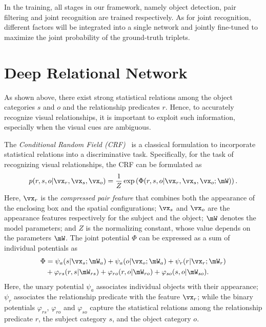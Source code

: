 \documentclass[10pt,twocolumn,letterpaper]{article}
\begin{document}
In the training, all stages in our framework, 
namely object detection, pair filtering and joint recognition are trained respectively.
As for joint recognition,
different factors will be integrated into a single network and jointly fine-tuned to 
maximize the joint probability of the ground-truth triplets.


\section{Deep Relational Network}\label{sec:drnet}

As shown above, there exist strong statistical relations among 
the object categories $s$ and $o$ and the relationship predicates $r$. 
Hence, to accurately recognize visual relationships, it is important
to exploit such information, especially when the visual cues are ambiguous.
 

The \emph{Conditional Random Field (CRF)}~\cite{lafferty2001conditional} 
is a classical formulation to incorporate statistical relations into a discriminative task.
%
Specifically, for the task of recognizing visual relationships, the CRF
can be formulated as
{\small
\begin{equation} \label{eq:crf0}
	p(r, s, o | \vx_r, \vx_s, \vx_o)
	= \frac{1}{Z} \exp \left( \Phi(r, s, o | \vx_r, \vx_s, \vx_o; \mW) \right).
\end{equation}
}
Here, $\vx_r$ is the \emph{compressed pair feature} that combines both the 
appearance of the enclosing box and the spatial configurations;
$\vx_s$ and $\vx_o$ are the appearance features respectively for the subject and the object;
$\mW$ denotes the model parameters;
and $Z$ is the normalizing constant, whose value depends on the parameters $\mW$.
%
The joint potential $\Phi$ can be expressed as a sum of individual potentials as
{\small
\begin{align} \label{eq:crf1}
	\Phi 
	&= \psi_a(s | \vx_s; \mW_a) 
	 + \psi_a(o | \vx_o; \mW_a) 
	 + \psi_r(r | \vx_r; \mW_r) \notag \\
	&+ \varphi_{rs}(r, s | \mW_{rs})
	 + \varphi_{ro}(r, o | \mW_{ro})
	 + \varphi_{so}(s, o | \mW_{so}).
\end{align}
}
Here, the unary potential $\psi_a$ associates individual objects with their appearance;
$\psi_r$ associates the relationship predicate with the feature $\vx_r$;
while the binary potentials $\varphi_{rs}$, $\varphi_{ro}$ and $\varphi_{so}$ capture 
the statistical relations among the relationship predicate $r$,  
the subject category $s$, and the object category $o$.
\end{document}
